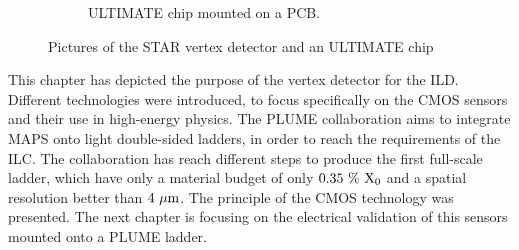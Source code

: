 \begin{figure}[!h]
\begin{subfigure}[t]{0.4\textwidth}
        \caption{ULTIMATE chip mounted on a PCB. %
        }
        \label{fig:ultimate}
    \end{subfigure}
    \caption{Pictures of the STAR vertex detector and an ULTIMATE chip}\label{fig:Mi28}
    \end{figure}    


    This chapter has depicted the purpose of the vertex detector for the \gls{ILD}.
    Different technologies were introduced, to focus specifically on the \gls{CMOS} sensors and their use in high-energy physics.
    The \gls{PLUME} collaboration aims to integrate \gls{MAPS} onto light double-sided ladders, in order to reach the requirements of the \gls{ILC}.
    The collaboration has reach different steps to produce the first full-scale ladder, which have only a material budget of only $0.35~\%~\rm{X_0}$ and a spatial resolution better than $4~\rm{\mu m}$.
    The principle of the \gls{CMOS} technology was presented. 
    The next chapter is focusing on the electrical validation of this sensors mounted onto a PLUME ladder.

    


